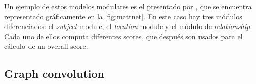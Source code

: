 Un ejemplo de estos modelos modulares es el presentado por ,
que se encuentra representado gráficamente en la \vref{fig:mattnet}. En este
caso hay tres módulos diferenciados: el \emph{subject} module, el
\emph{location} module y el módulo de \emph{relationship}. Cada uno de ellos
computa diferentes scores, que después son usados para el cálculo de un overall
score.

\subsection{Graph convolution} \label{sec:graph}
